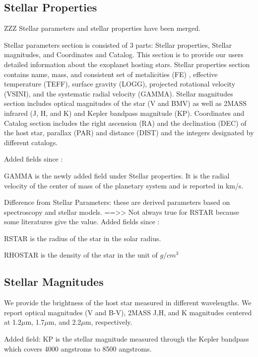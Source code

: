 \documentclass[11pt,preprint]{aastex}
\def\micron{$\mu$m}
\def\micron{$\mu$m}
\begin{document}
\begin{CJK*}{UTF8}{gbsn}

\subsection{Stellar Properties}
ZZZ Stellar parameters and stellar properties have been merged. 

Stellar parameters section is consisted of 3 parts: Stellar properties, Stellar magnitudes, and Coordinates and Catalog. This section is to provide our users detailed information about the exoplanet hosting stars. Stellar properties section contains name, mass, and consistent set of metalicities (FE) , effective temperature (TEFF), surface gravity (LOGG), projected rotational velocity (VSINI), and the systematic radial velocity (GAMMA). Stellar magnitudes section includes optical magnitudes of the star (V and BMV) as well as 2MASS infrared (J, H, and K) and Kepler bandpass magnitude (KP). Coordinates and Catalog section includes the right ascension (RA) and the declination (DEC) of the host star, parallax (PAR) and distance (DIST) and the integers designated by different catalogs. 

Added fields since \cite{Wright2011}:


GAMMA is the newly added field under Stellar properties. It is the radial velocity of the center of mass of the planetary system and is reported in km/s.  


Difference from Stellar Parameters: these are derived parameters based
on spectroscopy and stellar models. 
==>> Not always true for RSTAR because some literatures give the value. 
Added fields since \cite{Wright2011}:

RSTAR is the radius of the star in the solar radius. 

RHOSTAR is the density of the star in the unit of $g/cm^3$

\subsection {Stellar Magnitudes}

We provide the brightness of the host star measured in different wavelengths. We report optical magnitudes (V and B-V), 2MASS J,H, and K magnitudes centered at 1.2\micron, 1.7\micron, and 2.2\micron, respectively. 

Added field: 
KP is the stellar magnitude measured through the Kepler bandpass which covers 4000 angstroms to 8500 angstroms. 


\end{CJK*}
\end{document}
